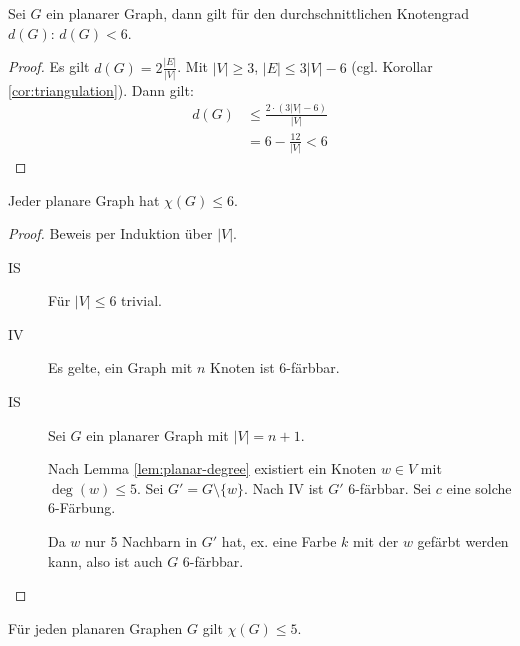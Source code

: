 \begin{lemma}
    \label{lem:planar-degree}
    Sei $ G $ ein planarer Graph, dann gilt für den durchschnittlichen Knotengrad $ d(G) $: $ d(G) < 6 $.
\end{lemma}

\begin{proof}
    Es gilt $ d(G) = 2 \frac{|E|}{|V|} $.
    Mit $ |V| \geq 3 $, $ |E| \leq 3 |V| - 6 $ (cgl. Korollar \ref{cor:triangulation}).
    Dann gilt:
    \begin{align*}
        d(G) & \leq \frac{2 \cdot (3|V| - 6)}{|V|} \\
        &= 6 - \frac{12}{|V|} < 6
    \end{align*}
\end{proof}

\begin{theorem}
    Jeder planare Graph hat $ \chi(G) \leq 6 $.
\end{theorem}

\begin{proof}
    Beweis per Induktion über $ |V| $.
    \begin{description}
        \item[IS] Für $ |V| \leq 6 $ trivial.
        \item[IV] Es gelte, ein Graph mit $ n $ Knoten ist 6-färbbar.
        \item[IS] Sei $ G $ ein planarer Graph mit $ |V| = n + 1 $.

        Nach Lemma \ref{lem:planar-degree} existiert ein Knoten $ w \in V $ mit $ \deg(w) \leq 5 $.
        Sei $ G' = G \setminus \{ w \} $.
        Nach IV ist $ G' $ 6-färbbar.
        Sei $ c $ eine solche 6-Färbung.

        Da $ w $ nur 5 Nachbarn in $ G' $ hat, ex. eine Farbe $ k $ mit der $ w $ gefärbt werden kann, also ist auch $ G $ 6-färbbar.
    \end{description}
\end{proof}

\begin{theorem}
    Für jeden planaren Graphen $ G $ gilt $ \chi(G) \leq 5 $.
\end{theorem}

